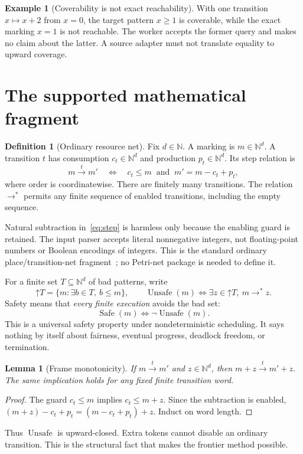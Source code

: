 \documentclass[11pt,a4paper]{article}
\newcommand{\N}{\mathbb N}
\newcommand{\Up}[1]{\mathord{\uparrow}#1}
\newcommand{\Unsafe}{\operatorname{Unsafe}}
\newcommand{\Safe}{\operatorname{Safe}}
\newtheorem{lemma}[theorem]{Lemma}
\theoremstyle{definition}
\newtheorem{definition}[theorem]{Definition}
\newtheorem{example}[theorem]{Example}
\theoremstyle{remark}
\begin{document}
\begin{example}[Coverability is not exact reachability]
With one transition $x\mapsto x+2$ from $x=0$, the target pattern $x\ge1$ is coverable, while the exact marking $x=1$ is not reachable. The worker accepts the former query and makes no claim about the latter. A source adapter must not translate equality to upward coverage.
\end{example}

\section{The supported mathematical fragment}\label{sec:fragment}
\begin{definition}[Ordinary resource net]
Fix $d\in\N$. A marking is $m\in\N^d$. A transition $t$ has consumption $c_t\in\N^d$ and production $p_t\in\N^d$. Its step relation is
\begin{equation}\label{eq:step}
 m\xrightarrow{t}m'\quad\Longleftrightarrow\quad
 c_t\le m\ \text{ and }\ m'=m-c_t+p_t,
\end{equation}
where order is coordinatewise. There are finitely many transitions. The relation $\to^*$ permits any finite sequence of enabled transitions, including the empty sequence.
\end{definition}
Natural subtraction in~\eqref{eq:step} is harmless only because the enabling guard is retained. The input parser accepts literal nonnegative integers, not floating-point numbers or Boolean encodings of integers. This is the standard ordinary place/transition-net fragment~\cite{occam}; no Petri-net package is needed to define it.

For a finite set $T\subseteq\N^d$ of bad patterns, write
\[
 \Up{T}=\{m:\exists b\in T,\ b\le m\},\qquad
 \Unsafe(m)\iff\exists z\in\Up{T},\ m\to^*z.
\]
Safety means that \emph{every finite execution} avoids the bad set:
\[
 \Safe(m)\iff\neg\Unsafe(m).
\]
This is a universal safety property under nondeterministic scheduling. It says nothing by itself about fairness, eventual progress, deadlock freedom, or termination.

\begin{lemma}[Frame monotonicity]\label{lem:frame}
If $m\xrightarrow{t}m'$ and $z\in\N^d$, then $m+z\xrightarrow{t}m'+z$. The same implication holds for any fixed finite transition word.
\end{lemma}
\begin{proof}
The guard $c_t\le m$ implies $c_t\le m+z$. Since the subtraction is enabled, $(m+z)-c_t+p_t=(m-c_t+p_t)+z$. Induct on word length.
\end{proof}
Thus $\Unsafe$ is upward-closed. Extra tokens cannot disable an ordinary transition. This is the structural fact that makes the frontier method possible.
\end{document}
